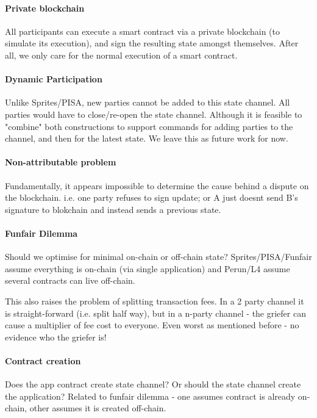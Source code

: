 \documentclass{llncs}
\begin{document}
\paragraph{Private blockchain} All participants can execute a smart contract via a private blockchain (to simulate its execution), and sign the resulting state amongst themselves. After all, we only care for the normal execution of a smart contract. 

\paragraph{Dynamic Participation} Unlike Sprites/PISA, new parties cannot be added to this state channel. All parties would have to close/re-open the state channel. Although it is feasible to "combine" both constructions to support commands for adding parties to the channel, and then for the latest state. We leave this as future work for now. 


\paragraph{Non-attributable problem} Fundamentally, it appears impossible to determine the cause behind a dispute on the blockchain. i.e. one party refuses to sign update; or A just doesnt send B's signature to blokchain and instead sends a previous state.

\paragraph{Funfair Dilemma} Should we optimise for minimal on-chain or off-chain state? Sprites/PISA/Funfair assume everything is on-chain (via single application) and Perun/L4 assume several contracts can live off-chain. 

This also raises the problem of splitting transaction fees. In a 2 party channel it is straight-forward (i.e. split half way), but in a n-party channel - the griefer can cause a multiplier of fee cost to everyone. Even worst as mentioned before - no evidence who the griefer is! 

\paragraph{Contract creation} Does the app contract create state channel? Or should the state channel create the application? Related to funfair dilemma - one assumes contract is already on-chain, other assumes it is created off-chain. 
\end{document}
